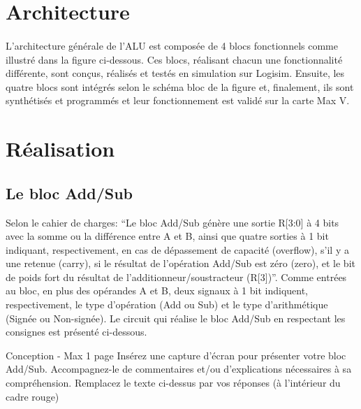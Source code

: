 \documentclass[a4paper]{article}
\begin{document}
\section{Architecture}
\paragraph{}
L’architecture générale de l’ALU est composée de 4 blocs fonctionnels comme illustré dans la figure ci-dessous. Ces blocs, réalisant chacun une fonctionnalité différente, sont conçus, réalisés et testés en simulation sur Logisim. Ensuite, les quatre blocs sont intégrés selon le schéma bloc de la figure et, finalement, ils sont synthétisés et programmés et leur fonctionnement est validé sur la carte Max V. 

\section{Réalisation}
\subsection{Le bloc Add/Sub}
\label{add_Sub}

Selon le cahier de charges: “Le bloc Add/Sub génère une sortie R[3:0] à 4 bits avec la somme ou la différence entre A et B, ainsi que quatre sorties à 1 bit indiquant, respectivement, en cas de dépassement de capacité (overflow), s’il y a une retenue (carry), si le résultat de l’opération Add/Sub est zéro (zero), et le bit de poids fort du résultat de l’additionneur/soustracteur (R[3])”. Comme entrées au bloc, en plus des opérandes A et B, deux signaux à 1 bit indiquent, respectivement, le type d’opération (Add ou Sub) et le type d’arithmétique (Signée ou Non-signée). Le circuit qui réalise le bloc Add/Sub en respectant les consignes est présenté ci-dessous.


\begin{tcolorbox}[colframe=Monokaimagenta,colback=white]
Conception - Max 1 page 
Insérez une capture d’écran pour présenter votre bloc Add/Sub.
Accompagnez-le de commentaires et/ou d’explications nécessaires à sa compréhension.
Remplacez le texte ci-dessus par vos réponses (à l’intérieur du cadre rouge)
\end{tcolorbox}
\end{document}
